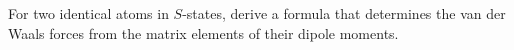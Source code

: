 \ProblemHeading For two identical atoms in $S$-states, derive a formula that determines the van der Waals forces from the matrix elements of their dipole moments.
